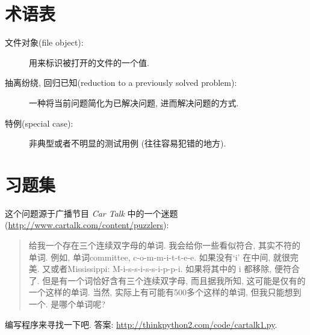 \documentclass[10pt]{book}
\begin{document}
\section{术语表}

\begin{description}

\item[文件对象(file object):] 用来标识被打开的文件的一个值.

\item[抽离纷绕, 回归已知(reduction to a previously solved problem):] 一种将当前问题简化为已解决问题, 进而解决问题的方式.

\item[特例(special case):] 非典型或者不明显的测试用例
(往往容易犯错的地方).

\end{description}


\section{习题集}

\begin{exercise}

这个问题源于广播节目 {\em Car Talk} 中的一个迷题
(\url{http://www.cartalk.com/content/puzzlers}):

\begin{quote}
给我一个存在三个连续双字母的单词. 
我会给你一些看似符合, 其实不符的单词. 
例如, 单词committee,  c-o-m-m-i-t-t-e-e. 
如果没有`i' 在中间, 就很完美. 
又或者Mississippi: M-i-s-s-i-s-s-i-p-p-i.
如果将其中的 i 都移除, 便符合了. 
但是有一个词恰好含有三个连续双字母, 而且据我所知, 
这可能是仅有的一个这样的单词. 
当然, 实际上有可能有500多个这样的单词, 但我只能想到一个. 
是哪个单词呢?
\end{quote}

编写程序来寻找一下吧. 
答案: \url{http://thinkpython2.com/code/cartalk1.py}.

\end{exercise}
\end{document}
